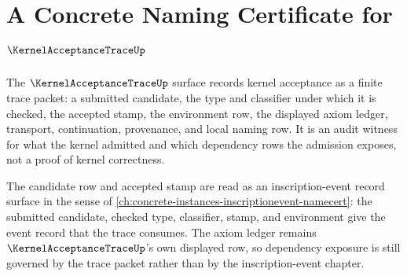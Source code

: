 \chapter{A Concrete Naming Certificate for $\KernelAcceptanceTraceUp$}
\label{ch:concrete-instances-kernelacceptancetrace-namecert}

The $\KernelAcceptanceTraceUp$ surface records kernel acceptance as a finite trace packet: a submitted candidate, the type and classifier under which it is checked, the accepted stamp, the environment row, the displayed axiom ledger, transport, continuation, provenance, and local naming row. It is an audit witness for what the kernel admitted and which dependency rows the admission exposes, not a proof of kernel correctness.

The candidate row and accepted stamp are read as an inscription-event record surface in the sense of \autoref{ch:concrete-instances-inscriptionevent-namecert}: the submitted candidate, checked type, classifier, stamp, and environment give the event record that the trace consumes. The axiom ledger remains $\KernelAcceptanceTraceUp$'s own displayed row, so dependency exposure is still governed by the trace packet rather than by the inscription-event chapter.

